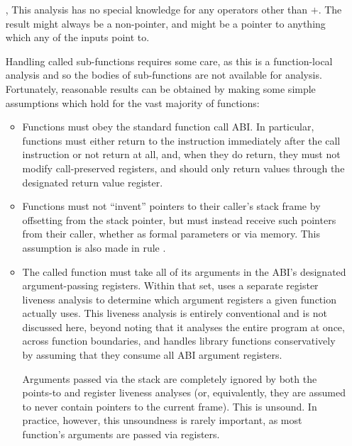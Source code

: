 \begin{itemize}
\item[\circled{5},\circled{6}] This analysis has no special knowledge
  for any operators other than $+$.  The result might always be a
  non-pointer, and might be a pointer to anything which any of the
  inputs point to.

\item[\circled{7}] Handling called sub-functions requires some care,
  as this is a function-local analysis and so the bodies of
  sub-functions are not available for analysis.  Fortunately,
  reasonable results can be obtained by making some simple assumptions
  which hold for the vast majority of functions:

  \begin{itemize}
  \item
    Functions must obey the standard function call ABI.  In
    particular, functions must either return to the instruction
    immediately after the call instruction or not return at all, and,
    when they do return, they must not modify call-preserved
    registers, and should only return values through the designated
    return value register.
  \item
    Functions must not ``invent'' pointers to their caller's stack
    frame by offsetting from the stack pointer, but must instead
    receive such pointers from their caller, whether as formal
    parameters or via memory.  This assumption is also made in rule
    .
  \item
    The called function must take all of its arguments in the ABI's
    designated argument-passing registers.  Within that set,
    {\technique} uses a separate register liveness analysis to
    determine which argument registers a given function actually uses.
    This liveness analysis is entirely conventional and is not
    discussed here, beyond noting that it analyses the entire program
    at once, across function boundaries, and handles library functions
    conservatively by assuming that they consume all ABI argument
    registers.

    Arguments passed via the stack are completely ignored by both the
    points-to and register liveness analyses (or, equivalently, they
    are assumed to never contain pointers to the current frame).  This
    is unsound.  In practice, however, this unsoundness is rarely
    important, as most function's arguments are passed via registers.
  \end{itemize}


\end{itemize}
